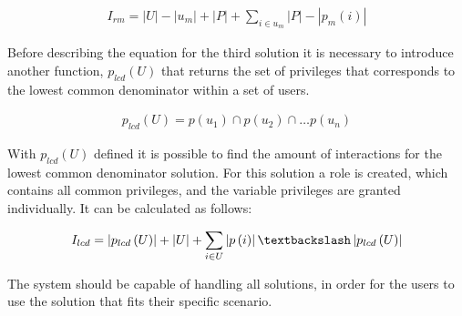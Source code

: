 \begin{align}
I_{rm} = |U| - |u_{m}| + |P| + \sum_{i \in u_{m}} |P|-|p_{m}(i)|
\end{align}

Before describing the equation for the third solution it is necessary to introduce another function, $p_{lcd}(U)$ that returns the set of privileges that corresponds to the lowest common denominator within a set of users.

\begin{align}
p_{lcd}(U) = p(u_1) \cap p(u_2) \cap \dots p(u_n)
\end{align}

With $p_{lcd}(U)$ defined it is possible to find the amount of interactions for the lowest common denominator solution.
For this solution a role is created, which contains all common privileges, and the variable privileges are granted individually.
It can be calculated as follows:

\begin{align}
I_{lcd} = \left|p_{lcd}\left(U\right)\right| + \left|U\right| + \sum_{i \in U} \left|p\left(i\right)\right|\textbackslash\left|p_{lcd}\left(U\right)\right|
\end{align}

The system should be capable of handling all solutions, in order for the users to use the solution that fits their specific scenario.